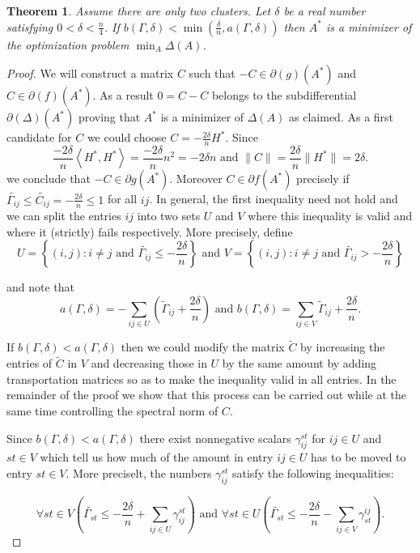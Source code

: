\documentclass[12pt]{amsart}
\newtheorem{thm}[lemma]{Theorem}
\theoremstyle{remark}
\begin{document}
\begin{thm}\label{thm: transport}  Assume there are only two clusters. Let $\delta$ be a real number satisfying $0<\delta< \frac{n}{4}$. If $b(\Gamma,\delta)< \min(\frac{\delta}{n}, a(\Gamma,\delta))$ then $A^*$ is a minimizer of the optimization problem $\min_A\Delta(A)$.
\end{thm} 
\begin{proof} We will construct a matrix $C$ such that 
$-C \in \partial(g)(A^*)$ and $C \in \partial(f)(A^*)$. As a result $0=C-C$ belongs to the subdifferential $\partial(\Delta)(A^*)$ proving that $A^*$ is a minimizer of $\Delta(A)$ as claimed. As a first candidate for $C$ we could choose $C=-\frac{2\delta}{n}H^*$. Since \[
 \frac{-2\delta}{n}\left \langle H^*,H^* \right \rangle =  \frac{-2\delta}{n}n^2 = -2\delta n \text{ and } \|C\|= \frac{2\delta}{n}\|H^*\|= 2\delta.
\]
we conclude that $-C\in \partial g(A^*)$. Moreover $C\in \partial f(A^*)$ precisely if $\widetilde{\Gamma_{ij}} \leq \widetilde{C_{ij}}= -\frac{2\delta}{n} \leq 1$ for all $ij$. 
In general, the first inequality need not hold and we can split the entries $ij$ into two sets $U$ and $V$ where this inequality is valid and where it (strictly) fails respectively. More precisely, define 
\[U=\left\{(i,j): i\neq j \text{ and $\widetilde{\Gamma_{ij}}\leq -\frac{2\delta}{n}$}\right\}\text{ and } V=\left\{(i,j): i\neq j \text{ and $\widetilde{\Gamma_{ij}}>-\frac{2\delta}{n}$}\right\}\] 

and note that
\[
a(\Gamma,\delta) = -\sum_{ij \in U}\left( \widetilde{\Gamma}_{ij}+ \frac{2\delta}{n}\right) \text{ and } b(\Gamma,\delta) =  \sum_{ij \in V} \widetilde{\Gamma}_{ij} + \frac{2\delta}{n}.
\]


If $b(\Gamma,\delta)< a(\Gamma,\delta)$ then we could modify the matrix $\widetilde{C}$ by increasing the entries of $\widetilde{C}$ in $V$ and decreasing those in $U$ by the same amount by adding transportation matrices so as to make the inequality valid in all entries. In the remainder of the proof we show that this process can be carried out while at the same time controlling the spectral norm of $C$.

Since $b(\Gamma,\delta)<a(\Gamma,\delta)$ there exist nonnegative scalars $\gamma_{ij}^{st}$ for $ij\in U$ and $st\in V$ which tell us how much of the amount in entry $ij\in U$ has to be moved to entry $st\in V$. More preciselt, the numbers $\gamma_{ij}^{st}$ satisfy the following inequalities:

\begin{equation}\label{ineqs1}
\forall st\in V\left( \widetilde{\Gamma_{st}}  \leq -\frac{2\delta}{n} +\sum_{ij\in U}\gamma_{ij}^{st}\right) \text{ and } \forall st\in U\left( \widetilde{\Gamma_{st}} \leq -\frac{2\delta}{n} -\sum_{ij\in V}\gamma_{st}^{ij}\right).
\end{equation} 


\end{proof}
\end{document}
